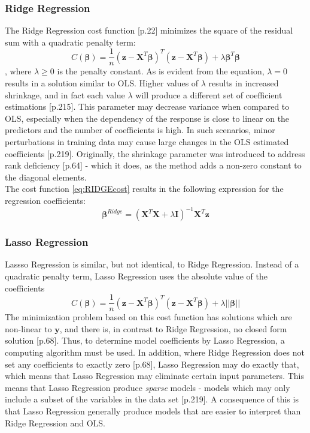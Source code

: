 \documentclass[%
oneside,                 %
final,                   %
10pt]{article}
\begin{document}
\subsubsection{Ridge Regression}
The Ridge Regression cost function \citep{MehtaPankaj2019Ahli}[p.22] minimizes the square of the residual sum with a quadratic penalty term:
\begin{equation}
C(\bm{\beta})=\frac{1}{n}(\bm{z}-\bm{X}^T\bm{\beta})^T(\bm{z}-\bm{X}^T\bm{\beta})+\lambda \bm{\beta}^T\bm{\beta}
\label{eq:RIDGEcost}
\end{equation}
, where $ \lambda \geq 0$ is the penalty constant. As is evident from the equation, $\lambda=0$ results in a solution similar to OLS. Higher values of $\lambda$ results in increased shrinkage, and in fact each value $\lambda$ will produce a different set of coefficient estimations \citep{2017introstatlearn}[p.215]. This parameter may decrease variance when compared to OLS, especially when the dependency of the response is close to linear on the predictors and the number of coefficients is high. In such scenarios, minor perturbations in training data may cause large changes in the OLS estimated coefficients \citep{2017introstatlearn}[p.219].
 Originally, the shrinkage parameter was introduced to address rank deficiency \citep{HastieTrevor2009TEoS}[p.64] - which it does, as the method adds a non-zero constant to the diagonal elements. \\
The cost function \eqref{eq:RIDGEcost} results in the following expression for the regression coefficients:
\begin{equation}
\bm{\beta}^{Ridge}=(\bm{X}^T\bm{X}+\lambda\bm{I})^{-1}\bm{X}^T\bm{z}
\end{equation}


\subsubsection{Lasso Regression}
Lassso Regression is similar, but not identical, to Ridge Regression. Instead of a quadratic penalty term, Lasso Regression uses the absolute value of the coefficients \citep{MHJ_LinReg}
\begin{equation}
C(\bm{\beta})=\frac{1}{n}(\bm{z}-\bm{X}^T\bm{\beta})^T(\bm{z}-\bm{X}^T\bm{\beta})+\lambda ||\bm{\beta}||
\label{eq:LassoCost}
\end{equation}
The minimization problem based on this cost function has solutions which are non-linear to $\bm{y}$, and there is, in contrast to Ridge Regression, no closed form solution \citep{HastieTrevor2009TEoS}[p.68]. Thus, to determine model coefficients by Lasso Regression, a computing algorithm must be used. In addition, where Ridge Regression does not set any coefficients to exactly zero \citep{HastieTrevor2009TEoS}[p.68], Lasso Regression may do exactly that, which means that Lasso Regression may eliminate certain input parameters. This means that Lasso Regression produce \textit{sparse} models - models which may only include a subset of the variables in the data set \citep{2017introstatlearn}[p.219]. A consequence of this is that Lasso Regression generally produce models that are easier to interpret than Ridge Regression and OLS. 
\end{document}
